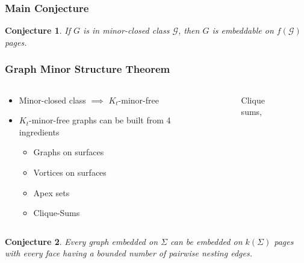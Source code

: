 \documentclass[english]{beamer}
\newtheorem{conjecture}{Conjecture}
\begin{document}
\begin{frame}
  \frametitle{Main Conjecture}
  \begin{conjecture}
    If $G$ is in minor-closed class $\mathcal{G}$, then $G$ is embeddable on $f(\mathcal{G})$ pages.
  \end{conjecture}
\end{frame}

\begin{frame}
  \frametitle{Graph Minor Structure Theorem}
  \begin{columns}
    \begin{column}{0.5\textwidth}
      \begin{itemize}
        \item Minor-closed class $\implies$ $K_t$-minor-free
        \item $K_t$-minor-free graphs can be built from 4 ingredients \cite{robertsonGraphMinorsXVII1999} \begin{itemize}
                \item Graphs on surfaces
                \item Vortices on surfaces
                \item Apex sets
                \item Clique-Sums
              \end{itemize}
      \end{itemize}
    \end{column}
    \begin{column}{0.5\textwidth}
      \begin{figure}
        \centering
        
        \caption{Clique sums, \cite{eppsteinCliquesum2023}}
      \end{figure}
    \end{column}
  \end{columns}
\end{frame}

\begin{frame}
  \begin{conjecture}
    Every graph embedded on $\Sigma$ can be embedded on $k(\Sigma)$ pages with every face having a bounded number of pairwise nesting edges.
  \end{conjecture}
\end{frame}

\begin{frame}[shrink = 50]

  \printbibliography
\end{frame}
\end{document}
